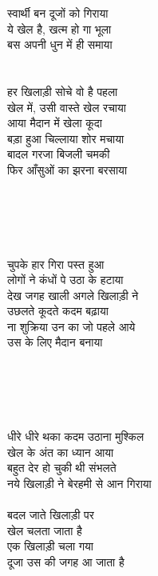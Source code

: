 {{{{{{{{{{{{{{{{{{{{{{{{{{{{{{{{{{{{{{{{{{{{{{{{{स्वार्थी बन दूजों को गिराया\\
ये खेल है, खत्म हो गा भूला\\
बस अपनी धुन में ही समाया\\
\\
\\
हर खिलाड़ी सोचे वो है पहला \\
खेल में, उसी वास्ते खेल रचाया\\
आया मैदान में खेला कूदा\\
बड़ा हुआ चिल्लाया शोर मचाया\\
बादल गरजा बिजली चमकी\\
फिर आँसुओं का झरना बरसाया\\
\\
\\
\\
\\
\\
चुपके हार गिरा पस्त हुआ\\
लोगों ने कंधों पे उठा के हटाया\\
देख जगह खाली अगले खिलाड़ी ने\\
उछलते कूदते कदम बढ़ाया\\
ना शुक्रिया उन का जो पहले आये\\
उस के लिए मैदान बनाया\\
\\
\\
\\
\\
\\
धीरे धीरे थका कदम उठाना मुश्किल\\
खेल के अंत का ध्यान आया \\
बहुत देर हो चुकी थी संभलते\\
नये खिलाड़ी ने बेरहमी से आन गिराया\\
\\
बदल जाते खिलाड़ी पर\\
खेल चलता जाता है\\
एक खिलाड़ी चला गया\\
दूजा उस की जगह आ जाता है\\
\\
\\
}}}}}}}}}}}}}}}}}}}}}}}}}}}}}}}}}}}}}}}}}}}}}}}}}
